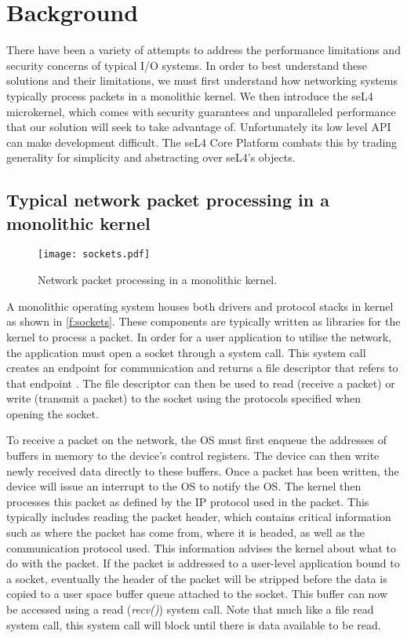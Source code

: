 \chapter{Background}\label{ch:background}

There have been a variety of attempts to address the performance limitations and security
concerns of typical I/O systems. In order to best 
understand these solutions and their limitations, we must first understand how networking 
systems typically process packets in a monolithic kernel.
We then introduce the seL4 microkernel, which comes with security guarantees and unparalleled
performance that our solution will seek to take advantage of. Unfortunately its low level API can 
make development difficult. The seL4 Core Platform combats this by trading generality for 
simplicity and abstracting over seL4's objects. 

\section{Typical network packet processing in a monolithic kernel}\label{s:sockets}
\begin{figure}[h]
	\centering
	\texttt{[image: sockets.pdf]}
	\caption{Network packet processing in a monolithic kernel.}
	\label{f:sockets}
\end{figure}

A monolithic operating system houses both drivers and protocol stacks in kernel as shown in
\autoref{f:sockets}. These components are typically written as libraries for the kernel to 
process a packet. In order for
a user application to utilise the network, the application must open a socket through a system
call. This system call creates an endpoint for communication and returns a file descriptor that refers
to that endpoint \cite{Linux:socket}. The file descriptor can then be used to read (receive a packet)
or write (transmit a packet) to the socket using the protocols specified when opening the socket.

To receive a packet on the network, the OS must first enqueue the addresses of buffers in memory to 
the device's control registers. The device can then write newly received data directly to these buffers. 
Once a packet has been written, the device will issue an interrupt to the OS to notify the OS. The 
kernel then processes this packet as defined by the IP protocol used in the packet. This typically 
includes reading the packet header, which contains critical information such as where the packet has
come from, where it is headed, as well as the communication protocol used. This information advises the
kernel about what to do with the packet. If the packet is addressed to a user-level application bound to
a socket, eventually the header of the packet will be stripped before the data is copied to a user space 
buffer queue attached to the socket. This buffer can now be accessed using a read (\emph{recv()}) system 
call. Note that much like a file read system call, this system call will block until there is data
available to be read.

